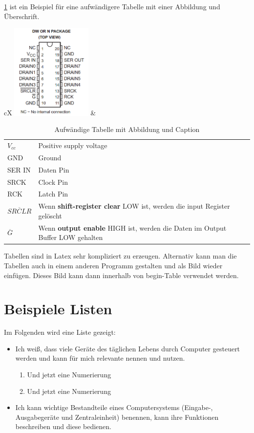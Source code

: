 \cref{tbl:shiftReg} ist ein Beispiel für eine aufwändigere Tabelle mit einer
Abbildung und Überschrift.

\begin{table}
     \begin{center}
     \begin{tabularx}{\textwidth}{ cX  } 
      \includegraphics[width=0.3\textwidth]{figures/shift_reg.png}  & 
      {\begin{tabularx}{\cellwidth}{ lX  }      
      $V_{cc}$ & Positive supply voltage\\
      GND & Ground \\
      SER IN & Daten Pin \\
      SRCK & Clock Pin \\
      RCK & Latch Pin \\
      $\overline{SRCLR}$ & Wenn \textbf{shift-register clear} LOW ist, werden die input Register gelöscht\\
      $\overline{G}$ & Wenn \textbf{output enable} HIGH ist, werden die Daten im Output Buffer LOW gehalten
      \end{tabularx}   }
      \end{tabularx}
      \caption{Aufwändige Tabelle mit Abbildung und Caption}
      \label{tbl:shiftReg}
      \end{center}
\end{table}

Tabellen sind in Latex sehr kompliziert zu erzeugen. Alternativ kann man die Tabellen auch in einem anderen Programm gestalten und als Bild wieder einfügen. Dieses Bild kann dann innerhalb von begin-Table verwendet werden.

\section{Beispiele Listen}
Im Folgenden wird eine Liste gezeigt:
\begin{itemize}
  \item Ich weiß, dass viele Geräte des täglichen Lebens durch Computer
  gesteuert werden und kann für mich relevante nennen und nutzen.
  \begin{enumerate}
  	\item Und jetzt eine Numerierung
  	\item Und jetzt eine Numerierung
  \end{enumerate}
  \item Ich kann wichtige Bestandteile eines Computersystems (Eingabe-,
  Ausgabegeräte und Zentraleinheit) benennen, kann ihre Funktionen beschreiben
  und diese bedienen.
\end{itemize}

